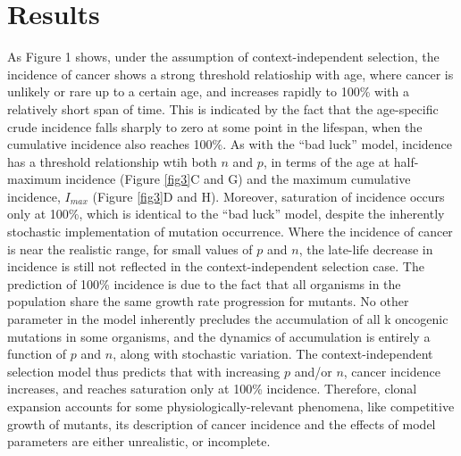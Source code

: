 \documentclass[9pt,twocolumn,twoside]{pnas-new}
\begin{document}
\section*{Results}
As Figure 1 shows, under the assumption of context-independent selection, the incidence of cancer shows a strong threshold relatioship with age, where cancer is unlikely or rare up to a certain age, and increases rapidly to 100\% with a relatively short span of time. This is indicated by the fact that the age-specific crude incidence falls sharply to zero at some point in the lifespan, when the cumulative incidence also reaches 100\%. As with the ``bad luck'' model, incidence has a threshold relationship wtih both $n$ and $p$, in terms of the age at half-maximum incidence (Figure \ref{fig3}C and G) and the maximum cumulative incidence, $I_{max}$ (Figure \ref{fig3}D and H). Moreover, saturation of incidence occurs only at 100\%, which is identical to the ``bad luck'' model, despite the inherently stochastic implementation of mutation occurrence. Where the incidence of cancer is near the realistic range, for small values of $p$ and $n$, the late-life decrease in incidence is still not reflected in the context-independent selection case. The prediction of 100\% incidence is due to the fact that all organisms in the population share the same growth rate progression for mutants. No other parameter in the model inherently precludes the accumulation of all k oncogenic mutations in some organisms, and the dynamics of accumulation is entirely a function of $p$ and $n$, along with stochastic variation. The context-independent selection model thus predicts that with increasing $p$ and/or $n$, cancer incidence increases, and reaches saturation only at 100\% incidence. Therefore, clonal expansion accounts for some physiologically-relevant phenomena, like competitive growth of mutants, its description of cancer incidence and the effects of model parameters are either unrealistic, or incomplete.
\end{document}
